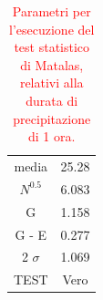 \begin{table}[H] \centering
    \caption{\textcolor{red}{Parametri per l'esecuzione del test statistico di Matalas, relativi alla durata di precipitazione di 1 ora.}}
    \begin{tabular}{cc}
    \toprule
    media                  & 25.28 \\
    $N ^{0.5}$             &  6.083\\
    G                      & 1.158 \\
    G - E                  &  0.277\\
    2 $\sigma$             & 1.069 \\
    TEST                   & Vero \\
    \bottomrule
    \end{tabular}
\end{table}

